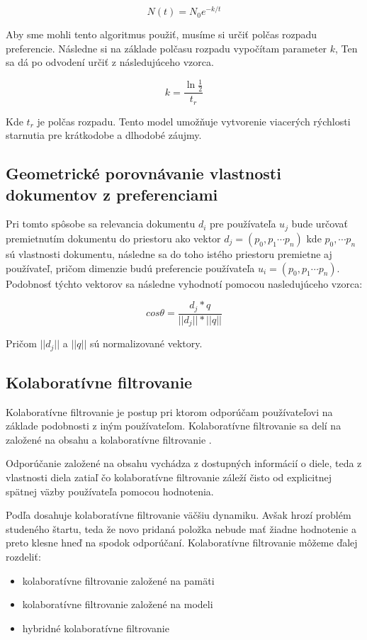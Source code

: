 \[N(t) = N_0e^{-k/t}\]

Aby sme mohli tento algoritmus použiť, musíme si určiť polčas rozpadu preferencie. Následne si na základe polčasu rozpadu vypočítam parameter \(k\), Ten sa dá po odvodení určiť z následujúceho vzorca.

\[k = \frac{\ln{\frac{1}{2}}}{t_r}\]\cite{7}

Kde \(t_r\) je polčas rozpadu. Tento model umožňuje vytvorenie viacerých rýchlosti starnutia pre krátkodobe a dlhodobé záujmy\cite{8}.


\subsection{Geometrické porovnávanie vlastnosti dokumentov z preferenciami}

Pri tomto spôsobe sa relevancia dokumentu \(d_i\) pre používateľa \(u_j\) bude určovať premietnutím dokumentu do priestoru ako vektor \(d_j=(p_0, p_1\cdots p_n)\) kde \(p_0, \cdots p_n\) sú vlastnosti dokumentu, následne sa do toho istého priestoru premietne aj používateľ, pričom dimenzie budú preferencie používateľa \(u_i=(p_0, p_1 \cdots p_n)\). Podobnosť týchto vektorov sa následne vyhodnotí pomocou nasledujúceho vzorca:

\[cos \theta = \frac{d_j * q}{||d_j||*||q||}\]

Pričom \(||d_j||\) a \(||q||\) sú normalizované vektory\cite{9}.


\subsection{Kolaboratívne filtrovanie}

Kolaboratívne filtrovanie je postup pri ktorom odporúčam používateľovi na základe podobnosti z iným používateľom. Kolaboratívne filtrovanie sa delí na založené na obsahu a kolaboratívne filtrovanie  \cite{10}.

Odporúčanie založené na obsahu vychádza z dostupných informácií o diele, teda z vlastnosti diela zatiaľ čo kolaboratívne filtrovanie záleží čisto od explicitnej spätnej väzby používateľa pomocou hodnotenia.

Podľa \cite{10} dosahuje kolaboratívne filtrovanie väčšiu dynamiku. Avšak hrozí problém studeného štartu, teda že novo pridaná položka nebude mať žiadne hodnotenie a preto klesne hneď na spodok odporúčaní. Kolaboratívne filtrovanie môžeme ďalej rozdeliť:

\begin{itemize}
\item{kolaboratívne filtrovanie založené na pamäti}
\item{kolaboratívne filtrovanie založené na modeli}
\item{hybridné kolaboratívne filtrovanie \cite{11}}
\end{itemize}

